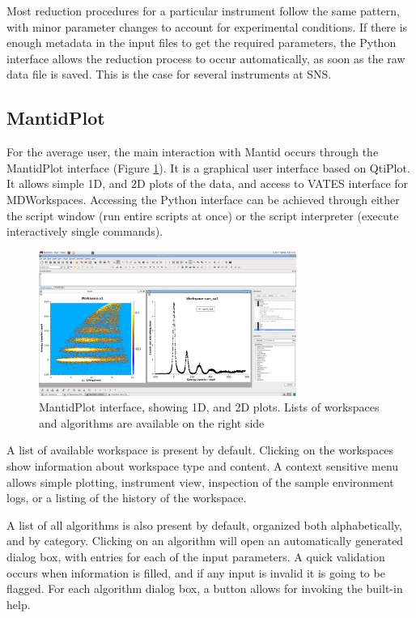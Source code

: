 \documentclass{elsarticle}
\begin{document}
Most reduction procedures for a particular instrument follow the same pattern, with minor parameter changes to account for experimental conditions. If there is enough metadata in the input files to get the required parameters, the Python interface allows the reduction process to occur automatically, as soon as the raw data file is saved. This is the case for several instruments at SNS. 

\subsection{MantidPlot}
For the average user, the main interaction with Mantid occurs through the MantidPlot interface (Figure \ref{fig:MantidPlot}). It is a graphical user interface based on QtiPlot\cite{qtiplot}. It allows simple 1D, and 2D plots of the data, and access to VATES interface for MDWorkspaces. Accessing the Python interface can be achieved through either the script window (run entire scripts at once) or the script interpreter (execute interactively single commands).

\begin{figure}[!ht]
\centerline{\includegraphics[width=0.75\textwidth]{MantidPlot.png}}
\caption{MantidPlot interface, showing 1D, and 2D plots. Lists of workspaces and algorithms are available on the right side}
\label{fig:MantidPlot}
\end{figure}
A list of available workspace is present by default. Clicking on the workspaces show information about workspace type and content. A context sensitive menu allows simple plotting, instrument view, inspection of the sample environment logs, or a listing of the history of the workspace.

A list of all algorithms is also present by default, organized both alphabetically, and by category. Clicking on an algorithm will open an automatically generated dialog box, with entries for each of the input parameters. A quick validation occurs when information is filled, and if any input is invalid it is going to be flagged. For each algorithm dialog box, a button allows for invoking the built-in help.
\end{document}
